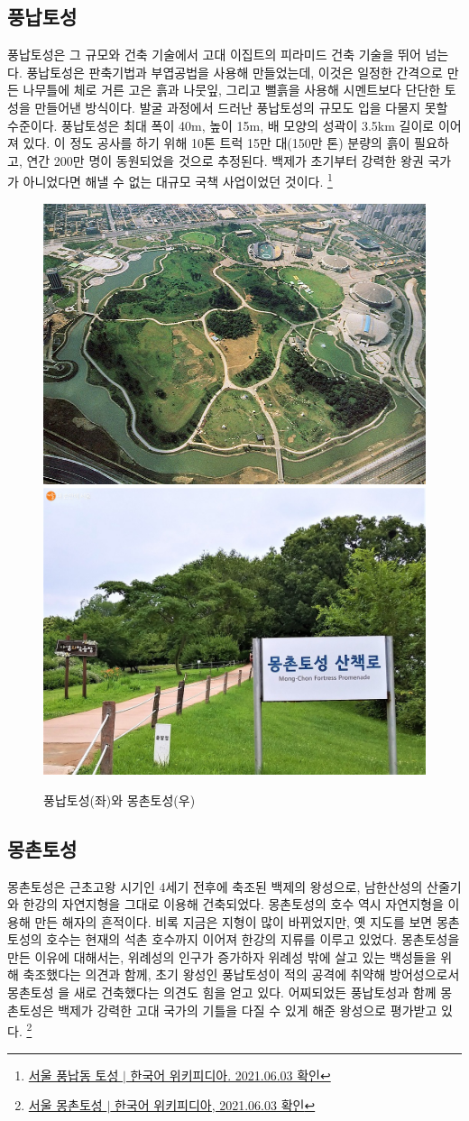 \subsection{풍납토성}


풍납토성은 그 규모와 건축 기술에서 고대 이집트의 피라미드 건축 기술을 뛰어 넘는
다. 풍납토성은 판축기법과 부엽공법을 사용해 만들었는데, 이것은 일정한 간격으로 만든
나무틀에 체로 거른 고은 흙과 나뭇잎, 그리고 뻘흙을 사용해 시멘트보다 단단한 토성을 
만들어낸 방식이다. 발굴 과정에서 드러난 풍납토성의 규모도 입을 다물지 못할 수준이다. 
풍납토성은 최대 폭이 40m, 높이 15m, 배 모양의 성곽이 3.5km 길이로 이어져 있다. 이 정도
공사를 하기 위해 10톤 트럭 15만 대(150만 톤) 분량의 흙이 필요하고, 연간 200만 
명이 동원되었을 것으로 추정된다. 백제가 초기부터 강력한 왕권 국가가 아니었다면 해낼 수
없는 대규모 국책 사업이었던 것이다.
\footnote{\href{https://ko.wikipedia.org/wiki/서울_풍납동_토성}{서울 풍납동 토성 $|$ 한국어 위키피디아. 2021.06.03 확인}}

\begin{figure}[ht]
    \centering
    \includegraphics[width=.45\textwidth]{e_img/ww_-004.jpg}
    \includegraphics[width=.45\textwidth]{e_img/ww_-005.jpg}
    \caption{풍납토성(좌)와 몽촌토성(우)}
    \label{fig:haryu6}
\end{figure}

\subsection{몽촌토성}
몽촌토성은 근초고왕 시기인 4세기 전후에 축조된 백제의 왕성으로, 남한산성의 
산줄기와 한강의 자연지형을 그대로 이용해 건축되었다. 몽촌토성의 호수 역시 자연지형을
이용해 만든 해자의 흔적이다. 비록 지금은 지형이 많이 바뀌었지만, 옛 지도를 보면 
몽촌토성의 호수는 현재의 석촌 호수까지 이어져 한강의 지류를 이루고 있었다. 몽촌토성을 
만든 이유에 대해서는, 위례성의 인구가 증가하자 위례성 밖에 살고 있는 백성들을 위해 
축조했다는 의견과 함께, 초기 왕성인 풍납토성이 적의 공격에 취약해 방어성으로서 몽촌토성
을 새로 건축했다는 의견도 힘을 얻고 있다. 어찌되었든 풍납토성과 함께 몽촌토성은 
백제가 강력한 고대 국가의 기틀을 다질 수 있게 해준 왕성으로 평가받고 있다.
\footnote {\href{https://ko.wikipedia.org/wiki/서울_몽촌토성}{서울 몽촌토성 $|$ 한국어 위키피디아, 2021.06.03 확인}}




